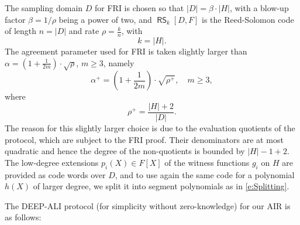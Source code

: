 \documentclass[11pt,article,oneside]{memoir}
\theoremstyle{definition}
\theoremstyle{remark}
\DeclareMathOperator{\RS}{\mathsf{RS}}
\begin{document}
The sampling domain $D$ for FRI is chosen so that $|D|=\beta\cdot |H|$, with a blow-up factor $\beta =1/\rho$ being a power of two, and $\RS_k[D,F]$ is the Reed-Solomon code of length $n= |D|$ and rate $\rho=\frac{k}{n}$, with
\begin{equation}
k = |H|.
\end{equation}
The agreement parameter used for FRI is taken slightly larger than $\alpha = \left(1+\frac{1}{2m}\right)\cdot\sqrt\rho$, $m\geq 3$, namely 
\begin{equation}
\alpha^+= \left(1+\frac{1}{2m}\right)\cdot \sqrt{\rho^+}, \quad m\geq 3, 
\end{equation}
where 
\begin{equation}
\rho^+=\frac{|H|+2}{|D|}.
\end{equation}
The reason for this slightly larger choice is due to the evaluation quotients of the protocol, which are subject to the FRI proof. 
Their denominators are at most quadratic and hence the degree of the non-quotients is bounded by $|H|-1 + 2$.
The low-degree extensions $p_i(X)\in F[X]$ of the witness functions $g_i$ on $H$ are provided as code words over $D$, and to use again the same code for a polynomial $h(X)$ of larger degree, we split it into segment polynomials as in \eqref{e:Splitting}. 


The DEEP-ALI protocol (for simplicity without zero-knowledge) for our AIR is as follows: 
\end{document}
